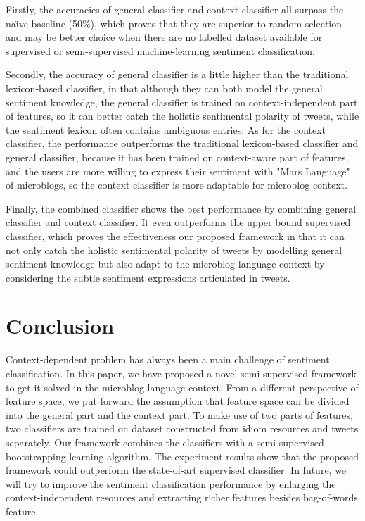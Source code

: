 \documentclass{llncs}
\begin{document}
Firstly, the accuracies of general classifier and context classifier all surpass the na\"\i ve baseline (50\%), which proves that they are superior to random selection and may be better choice when there are no labelled dataset available for supervised or semi-supervised machine-learning sentiment classification.

Secondly, the accuracy of general classifier is a little higher than the traditional lexicon-based classifier, in that although they can both model the general sentiment knowledge, the general classifier is trained on context-independent part of features, so it can better catch the holistic sentimental polarity of tweets, while the sentiment lexicon often contains ambiguous entries. 
As for the context classifier, the performance outperforms the traditional lexicon-based classifier and general classifier, because it has been trained on context-aware part of features, and the users are more willing to express their sentiment with "Mars Language" of microblogs, so the context classifier is more adaptable for microblog context.

Finally, the combined classifier shows the best performance by combining general classifier and context classifier. 
It even outperforms the upper bound supervised classifier, which proves the effectiveness our proposed framework in that it can not only catch the holistic sentimental polarity of tweets by modelling general sentiment knowledge but also adapt to the microblog language context by considering the subtle sentiment expressions articulated in tweets.

\section{Conclusion}
\label{conclusion}

Context-dependent problem has always been a main challenge of sentiment classification.
In this paper, we have proposed a novel semi-supervised framework to get it solved in the microblog language context. 
From a different perspective of feature space, we put forward the assumption that feature space can be divided into the general part and the context part.
To make use of two parts of features, two classifiers are trained on dataset constructed from idiom resources and tweets separately. 
Our framework combines the classifiers with a semi-supervised bootstrapping learning algorithm. 
The experiment results show that the proposed framework could outperform the state-of-art supervised classifier. 
In future, we will try to improve the sentiment classification performance by enlarging the context-independent resources and extracting richer features besides bag-of-words feature.



\end{document}
